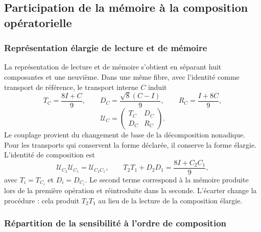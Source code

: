 \subsection{Participation de la mémoire à la composition opératorielle}
\label{md:restop:memoria}

\subsubsection{Représentation élargie de lecture et de mémoire}
\label{md:restop:estructura-partida}

La représentation de lecture et de mémoire s’obtient en séparant huit
composantes et une neuvième. Dans une même fibre, avec l’identité comme transport de
référence, le transport interne $C$ induit
\begin{equation}
 T_C=\frac{8I+C}{9},\qquad
 D_C=\frac{\sqrt8(C-I)}{9},\qquad
 R_C=\frac{I+8C}{9},
 \label{md:restop:bloques}
\end{equation}
\begin{equation}
 \mathcal U_C=
 \begin{pmatrix}
 T_C&D_C\\D_C&R_C
 \end{pmatrix}.
 \label{md:restop:transporte-ampliado}
\end{equation}
Le couplage provient du changement de base de la décomposition nonadique.
Pour les transports qui conservent la forme déclarée, il conserve la forme
élargie. L’identité de composition est
\begin{equation}
 \mathcal U_{C_2}\mathcal U_{C_1}
 =\mathcal U_{C_2C_1},\qquad
 T_2T_1+D_2D_1=\frac{8I+C_2C_1}{9},
 \label{md:restop:composicion-ampliada}
\end{equation}
avec $T_i=T_{C_i}$ et $D_i=D_{C_i}$.
Le second terme correspond à la mémoire produite lors de la première
opération et réintroduite dans la seconde. L’écarter change la
procédure : cela produit $T_2T_1$ au lieu de la lecture de la composition
élargie.

\subsubsection{Répartition de la sensibilité à l’ordre de composition}
\label{md:restop:conmutadores}

